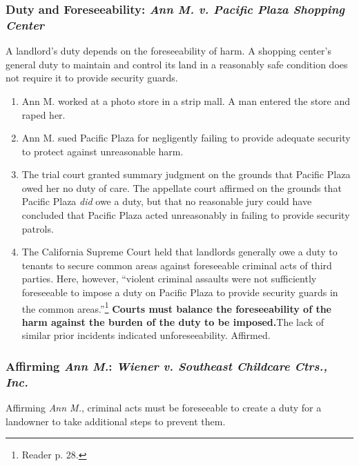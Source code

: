 \subsubsection{Duty and Foreseeability: \emph{Ann M. v. Pacific Plaza Shopping 
Center}}

A landlord's duty depends on the foreseeability of harm. A shopping center's 
general duty to maintain and control its land in a reasonably safe condition 
does not require it to provide security guards.

\begin{enumerate}
    \item Ann M. worked at a photo store in a strip mall. A man entered the 
    store and raped her.
    \item Ann M. sued Pacific Plaza for negligently failing to provide 
    adequate security to protect against unreasonable harm.
    \item The trial court granted summary judgment on the grounds that Pacific 
    Plaza owed her no duty of care. The appellate court affirmed on the 
    grounds that Pacific Plaza \emph{did} owe a duty, but that no reasonable 
    jury could have concluded that Pacific Plaza acted unreasonably in failing 
    to provide security patrols.
    \item The California Supreme Court held that landlords generally owe a 
    duty to tenants to secure common areas against foreseeable criminal acts 
    of third parties. Here, however, ``violent criminal assaults were not 
    sufficiently foreseeable to impose a duty on Pacific Plaza to provide 
    security guards in the common areas.''\footnote{Reader p. 28.} 
    \textbf{Courts must balance the foreseeability of the harm against the 
    burden of the duty to be imposed.}The lack of similar prior incidents 
    indicated unforeseeability. Affirmed.
\end{enumerate}

\subsubsection{Affirming \emph{Ann M.}: \emph{Wiener v. Southeast Childcare 
Ctrs., Inc.}}

Affirming \emph{Ann M.}, criminal acts must be foreseeable to create a duty 
for a landowner to take additional steps to prevent them.

